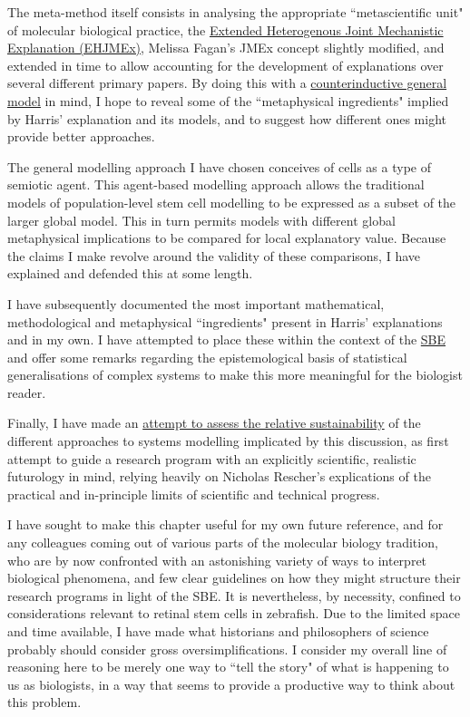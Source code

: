 The meta-method itself consists in analysing the appropriate ``metascientific unit" of molecular biological practice, the \hyperref[EHJMEx]{Extended Heterogenous Joint Mechanistic Explanation (EHJMEx)}, Melissa Fagan's JMEx concept \cite{Fagan2015} slightly modified, and extended in time to allow accounting for the development of explanations over several different primary papers. By doing this with a \hyperref[agentmodel]{counterinductive general model} in mind, I hope to reveal some of the ``metaphysical ingredients" implied by Harris' explanation and its models, and to suggest how different ones might provide better approaches.

The general modelling approach I have chosen conceives of cells as a type of semiotic agent. This agent-based modelling approach allows the traditional models of population-level stem cell modelling to be expressed as a subset of the larger global model. This in turn permits models with different global metaphysical implications to be compared for local explanatory value. Because the claims I make revolve around the validity of these comparisons, I have explained and defended this at some length.

I have subsequently documented the most important mathematical, methodological and metaphysical ``ingredients" present in Harris' explanations and in my own. I have attempted to place these within the context of the \hyperref[SBE]{SBE} and offer some remarks regarding the epistemological basis of statistical generalisations of complex systems to make this more meaningful for the biologist reader.

Finally, I have made an \hyperref[limits]{attempt to assess the relative sustainability} of the different approaches to systems modelling implicated by this discussion, as first attempt to guide a research program with an explicitly scientific, realistic futurology in mind, relying heavily on Nicholas Rescher's explications of the practical and in-principle limits of scientific and technical progress.

I have sought to make this chapter useful for my own future reference, and for any colleagues coming out of various parts of the molecular biology tradition, who are by now confronted with an astonishing variety of ways to interpret biological phenomena, and few clear guidelines on how they might structure their research programs in light of the SBE. It is nevertheless, by necessity, confined to considerations relevant to retinal stem cells in zebrafish. Due to the limited space and time available, I have made what historians and philosophers of science probably should consider gross oversimplifications. I consider my overall line of reasoning here to be merely one way to ``tell the story" of what is happening to us as biologists, in a way that seems to provide a productive way to think about this problem.

